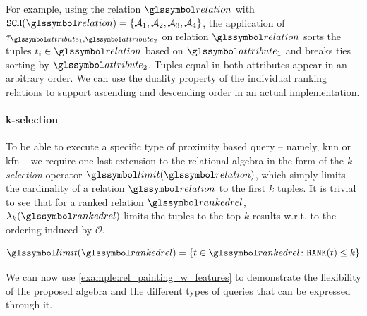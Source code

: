 For example, using the relation $\relation$ with $\mathtt{SCH}(\relation) = \{ \mathcal{A}_1, \mathcal{A}_2, \mathcal{A}_3, \mathcal{A}_4 \}$, the application of $\tau_{\attribute_1,\attribute_2}$ on relation $\relation$ sorts the tuples $t_i \in \relation$ based on $\attribute_1$ and breaks ties sorting by $\attribute_2$. Tuples equal in both attributes appear in an arbitrary order. We can use the duality property of the individual ranking relations to support ascending and descending order in an actual implementation.

\paragraph{k-selection}

To be able to execute a specific type of proximity based query -- namely, \acrshort{knn} or \acrshort{kfn} -- we require one last extension to the relational algebra in the form of the \emph{k-selection} operator $\limit(\relation)$, which simply limits the cardinality of a relation $\relation$ to the first $k$ tuples. It is trivial to see that for a ranked relation $\rankedrel$, $\lambda_k(\rankedrel)$ limits the tuples to the top $k$ results w.r.t. to the ordering induced by $\mathcal{O}$.

\begin{equation}
    \limit(\rankedrel) = \{ t \in \rankedrel \colon \mathtt{RANK}(t) \leq k \}
\end{equation}

We can now use \cref{example:rel_painting_w_features} to demonstrate the flexibility of the proposed algebra and the different types of queries that can be expressed through it.

